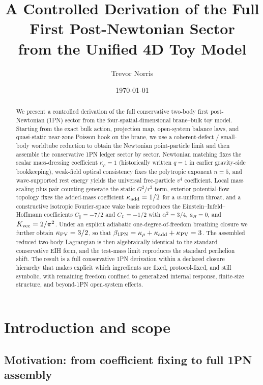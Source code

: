 \documentclass[11pt]{article}
\title{A Controlled Derivation of the Full First Post-Newtonian Sector\\
from the Unified 4D Toy Model}
\author{Trevor Norris}
\date{\today}
\newcommand{\krho}{\kappa_{\rho}}
\begin{document}
\maketitle

\begin{abstract}
We present a controlled derivation of the full conservative two-body first post-Newtonian (1PN) sector from the four-spatial-dimensional brane--bulk toy model. Starting from the exact bulk action, projection map, open-system balance laws, and quasi-static near-zone Poisson hook on the brane, we use a coherent-defect / small-body worldtube reduction to obtain the Newtonian point-particle limit and then assemble the conservative 1PN ledger sector by sector. Newtonian matching fixes the scalar mass-dressing coefficient \(\krho=1\) (historically written \(q=1\) in earlier gravity-side bookkeeping), weak-field optical consistency fixes the polytropic exponent \(n=5\), and wave-supported rest energy yields the universal free-particle \(v^4\) coefficient. Local mass scaling plus pair counting generate the static \(G^2/r^2\) term, exterior potential-flow topology fixes the added-mass coefficient \(\kappa_{\rm add}=1/2\) for a \(w\)-uniform throat, and a constructive isotropic Fourier-space wake basis reproduces the Einstein--Infeld--Hoffmann coefficients \(C_\parallel=-7/2\) and \(C_L=-1/2\) with \(\alpha^2=3/4\), \(a_H=0\), and \(K_{\rm vec}=2/\pi^2\). Under an explicit adiabatic one-degree-of-freedom breathing closure we further obtain \(\kappa_{\rm PV}=3/2\), so that \(\beta_{1\rm PN}=\kappa_\rho+\kappa_{\rm add}+\kappa_{\rm PV}=3\). The assembled reduced two-body Lagrangian is then algebraically identical to the standard conservative EIH form, and the test-mass limit reproduces the standard perihelion shift. The result is a full conservative 1PN derivation within a declared closure hierarchy that makes explicit which ingredients are fixed, protocol-fixed, and still symbolic, with remaining freedom confined to generalized internal response, finite-size structure, and beyond-1PN open-system effects.
\end{abstract}

\section{Introduction and scope}
\label{sec:intro}

\subsection{Motivation: from coefficient fixing to full 1PN assembly}
\end{document}
